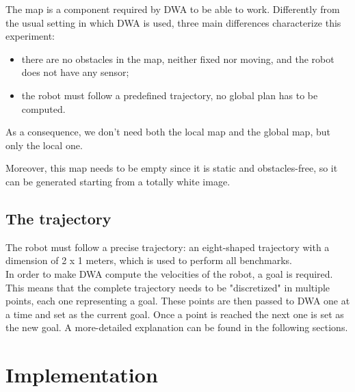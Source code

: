 \documentclass[11pt,a4paper]{article}
\begin{document}
The map is a component required by DWA to be able to work. Differently from the usual setting in which
DWA is used, three main differences characterize this experiment:
\begin{itemize}
    \item there are no obstacles in the map, neither fixed nor moving, and the robot does not have any sensor;
    \item the robot must follow a predefined trajectory, no global plan has to be computed.\\
\end{itemize}

As a consequence, we don't need both the local map and the global map, but only the local one.

Moreover, this map needs to be empty since it is static and obstacles-free, so it can be
generated starting from a totally white image.



\subsection{The trajectory}

The robot must follow a precise trajectory: an eight-shaped trajectory with a dimension of 2 x 1 meters,
which is used to perform all benchmarks.\\

In order to make DWA compute the velocities of the robot, a goal is required.
This means that the complete trajectory needs to be "discretized" in multiple points, each one representing a goal.
These points are then passed to DWA one at a time and set as the current goal.
Once a point is reached the next one is set as the new goal.
A more-detailed explanation can be found in the following sections.





\section{Implementation}


\end{document}
